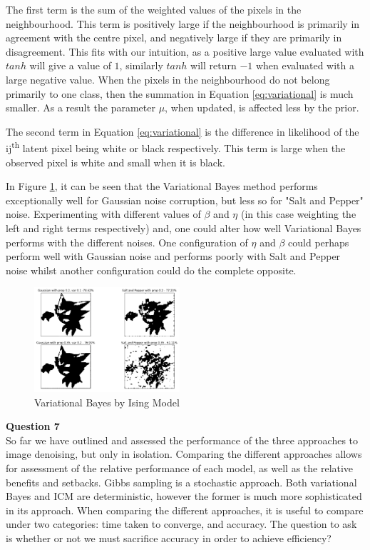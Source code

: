 \documentclass[10pt, a4paper, twocolumn]{article} %
\begin{document}
The first term is the sum of the weighted values of the pixels in the neighbourhood. This term is positively large if the neighbourhood is primarily in agreement with the centre pixel, and negatively large if they are primarily in disagreement. This fits with our intuition, as a positive large value evaluated with $tanh$ will give a value of $1$, similarly $tanh$ will return $-1$ when evaluated with a large negative value. When the pixels in the neighbourhood do not belong primarily to one class, then the summation in Equation \ref{eq:variational} is much smaller. As a result the parameter $\mu$, when updated, is affected less by the prior.


The second term in Equation \ref{eq:variational} is the difference in likelihood of the ij\textsuperscript{th} latent pixel being white or black respectively. This term is large when the observed pixel is white and small when it is black.

In Figure \ref{fig:variationalBayes}, it can be seen that the Variational Bayes method performs exceptionally well for Gaussian noise corruption, but less so for "Salt and Pepper" noise. Experimenting with different values of $\beta$ and $\eta$ (in this case weighting the left and right terms respectively) and, one could alter how well Variational Bayes performs with the different noises. One configuration of $\eta$ and $\beta$ could perhaps perform well with Gaussian noise and performs poorly with Salt and Pepper noise whilst another configuration could do the complete opposite.\\

\begin{figure}
    \centering
    \includegraphics[width=0.48\textwidth]{images/variationalBayes.png}
    \caption{Variational Bayes by Ising Model}
    \label{fig:variationalBayes}
\end{figure}

\noindent\textbf{Question 7}\\
So far we have outlined and assessed the performance of the three approaches to image denoising, but only in isolation. Comparing the different approaches allows for assessment of the relative performance of each model, as well as the relative benefits and setbacks. Gibbs sampling is a stochastic approach. Both variational Bayes and ICM are deterministic, however the former is much more sophisticated in its approach. When comparing the different approaches, it is useful to compare under two categories: time taken to converge, and accuracy. The question to ask is whether or not we must sacrifice accuracy in order to achieve efficiency? 
\end{document}
